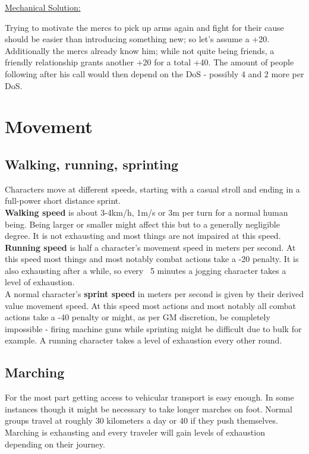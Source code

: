 \documentclass[12pt,a4paper,openany]{book}
\begin{document}
	\ul{Mechanical Solution:}
	\begin{exampleblock}
		Trying to motivate the mercs to pick up arms again and fight for their cause should be easier than introducing something new; so let's assume a +20. Additionally the mercs already know him; while not quite being friends, a friendly relationship grants another +20 for a total +40. The amount of people following after his call would then depend on the DoS - possibly 4 and 2 more per DoS.
	\end{exampleblock}
	
	\chapter{Movement}
	\section{Walking, running, sprinting}
	Characters move at different speeds, starting with a casual stroll and ending in a full-power short distance sprint.\\
	\textbf{Walking speed} is about 3-4km/h, 1m/s or 3m per turn for a normal human being. Being larger or smaller might affect this but to a generally negligible degree. It is not exhausting and most things are not impaired at this speed.\\
	\textbf{Running speed} is half a character’s movement speed in meters per second. At this speed most things and most notably combat actions take a -20 penalty. It is also exhausting after a while, so every ~5 minutes a jogging character takes a level of exhaustion.\\
	A normal character’s \textbf{sprint speed} in meters per second is given by their derived value movement speed. At this speed most actions and most notably all combat actions take a -40 penalty or might, as per GM discretion, be completely impossible - firing machine guns while sprinting might be difficult due to bulk for example. A running character takes a level of exhaustion every other round.
	\section{Marching}
	For the most part getting access to vehicular transport is easy enough. In some instances though it might be necessary to take longer marches on foot. Normal groups travel at roughly 30 kilometers a day or 40 if they push themselves. Marching is exhausting and every traveler will gain levels of exhaustion depending on their journey.
\end{document}
